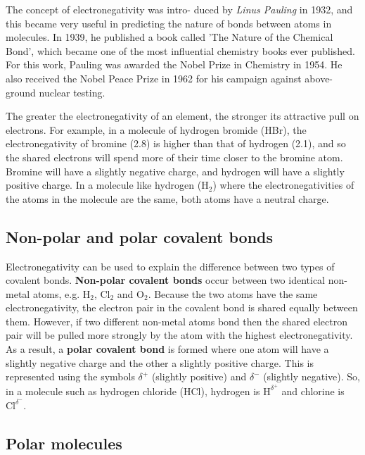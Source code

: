 \begin{IFact}{
The concept of electronegativity was intro- duced by \textit{Linus Pauling} in 1932, and this became very useful in predicting the nature of bonds between atoms in molecules. In 1939, he published a book called 'The Nature of the Chemical Bond', which became one of the most influential chemistry books ever published. For this work, Pauling was awarded the Nobel Prize in Chemistry in 1954. He also received the Nobel Peace Prize in 1962 for his campaign against above-ground nuclear testing.
}
\end{IFact}

The greater the electronegativity of an element, the stronger its attractive pull on electrons. For example, in a molecule of hydrogen bromide (HBr), the electronegativity of bromine (2.8) is higher than that of hydrogen (2.1), and so the shared electrons will spend more of their time closer to the bromine atom. Bromine will have a slightly negative charge, and hydrogen will have a slightly positive charge. In a molecule like hydrogen (H$_{2}$) where the electronegativities of the atoms in the molecule are the same, both atoms have a neutral charge. \\

\subsection{Non-polar and polar covalent bonds}

Electronegativity can be used to explain the difference between two
types of covalent bonds. \textbf{Non-polar covalent bonds} occur between two
identical non-metal atoms, e.g. H$_2$, Cl$_2$ and O$_2$. Because the two atoms
have the same electronegativity, the electron pair in the covalent
bond is shared equally between them. However, if two different
non-metal atoms bond then the shared electron pair will be pulled more
strongly by the atom with the highest electronegativity. As a result, a \textbf{polar covalent bond} is formed where one atom will have a slightly negative charge and the other a slightly
positive charge. This is represented using the symbols $\delta^{+}$ (slightly positive) and $\delta^{-}$ (slightly negative). So, in a molecule such as hydrogen chloride (HCl), hydrogen is $\text{H}^{\delta^{+}}$ and chlorine is $\text{Cl}^{\delta^{-}}$.

\subsection{Polar molecules}

